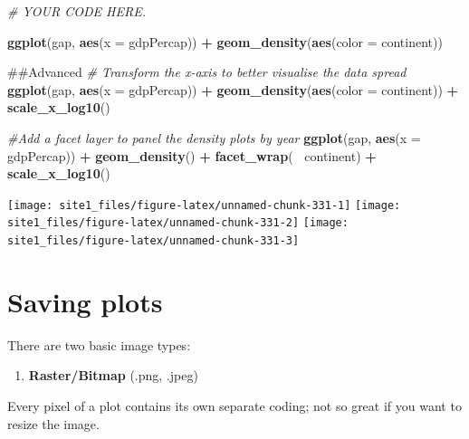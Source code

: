 \documentclass[]{book}
\newenvironment{Shaded}{\begin{snugshade}}{\end{snugshade}}
\newcommand{\KeywordTok}[1]{\textcolor[rgb]{0.13,0.29,0.53}{\textbf{#1}}}
\newcommand{\DataTypeTok}[1]{\textcolor[rgb]{0.13,0.29,0.53}{#1}}
\newcommand{\StringTok}[1]{\textcolor[rgb]{0.31,0.60,0.02}{#1}}
\newcommand{\CommentTok}[1]{\textcolor[rgb]{0.56,0.35,0.01}{\textit{#1}}}
\newcommand{\OperatorTok}[1]{\textcolor[rgb]{0.81,0.36,0.00}{\textbf{#1}}}
\newcommand{\NormalTok}[1]{#1}
\providecommand{\tightlist}{%
  \setlength{\itemsep}{0pt}\setlength{\parskip}{0pt}}
\begin{document}
\begin{Shaded}
\begin{Highlighting}[]
\CommentTok{# YOUR CODE HERE.}

\KeywordTok{ggplot}\NormalTok{(gap, }\KeywordTok{aes}\NormalTok{(}\DataTypeTok{x =}\NormalTok{ gdpPercap)) }\OperatorTok{+}
\StringTok{  }\KeywordTok{geom_density}\NormalTok{(}\KeywordTok{aes}\NormalTok{(}\DataTypeTok{color =}\NormalTok{ continent))}

\NormalTok{##Advanced}
\CommentTok{# Transform the x-axis to better visualise the data spread}
\KeywordTok{ggplot}\NormalTok{(gap, }\KeywordTok{aes}\NormalTok{(}\DataTypeTok{x =}\NormalTok{ gdpPercap)) }\OperatorTok{+}
\StringTok{  }\KeywordTok{geom_density}\NormalTok{(}\KeywordTok{aes}\NormalTok{(}\DataTypeTok{color =}\NormalTok{ continent)) }\OperatorTok{+}
\StringTok{  }\KeywordTok{scale_x_log10}\NormalTok{()}

\CommentTok{#Add a facet layer to panel the density plots by year}
\KeywordTok{ggplot}\NormalTok{(gap, }\KeywordTok{aes}\NormalTok{(}\DataTypeTok{x =}\NormalTok{ gdpPercap)) }\OperatorTok{+}
\StringTok{  }\KeywordTok{geom_density}\NormalTok{() }\OperatorTok{+}
\StringTok{  }\KeywordTok{facet_wrap}\NormalTok{(}\OperatorTok{~}\StringTok{ }\NormalTok{continent) }\OperatorTok{+}
\StringTok{  }\KeywordTok{scale_x_log10}\NormalTok{()}
\end{Highlighting}
\end{Shaded}

\begin{center}\texttt{[image: site1\_files/figure-latex/unnamed-chunk-331-1]} \texttt{[image: site1\_files/figure-latex/unnamed-chunk-331-2]} \texttt{[image: site1\_files/figure-latex/unnamed-chunk-331-3]} \end{center}

\section{Saving plots}\label{saving-plots}

There are two basic image types:

\begin{enumerate}
\def\labelenumi{\arabic{enumi})}
\tightlist
\item
  \textbf{Raster/Bitmap} (.png, .jpeg)
\end{enumerate}

Every pixel of a plot contains its own separate coding; not so great if
you want to resize the image.
\end{document}
